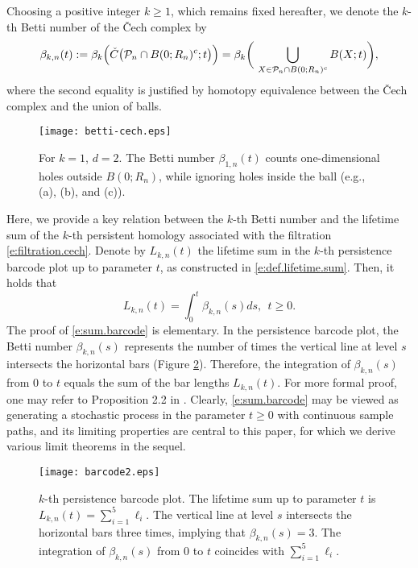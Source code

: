 \documentclass[11pt]{amsart}
\numberwithin{equation}{section}
\theoremstyle{plain}
\theoremstyle{definition}
\begin{document}
Choosing a positive integer $k \geq 1$, which remains fixed hereafter, we denote the $k$-th Betti number of the \v{C}ech complex by
$$   
\beta_{k,n}(t) := \beta_k \Bigl( \check{C}\bigl( {\mathcal P_n} \cap B(0;R_n)^c; t \bigr) \Bigr)
= \beta_k \biggl(\ \bigcup_{X \in {\mathcal P_n} \cap B(0; R_n)^c} B(X; t) \biggr),
$$
where the second equality is justified by homotopy equivalence between the \v{C}ech complex and the union of balls.
\begin{figure}[!t]
\begin{center}
\texttt{[image: betti-cech.eps]}
\caption{{\footnotesize For $k=1$, $d=2$. The Betti number $\beta_{1,n}(t)$ counts one-dimensional holes outside $B(0; R_n)$, while ignoring holes inside the ball (e.g., (a), (b), and (c)). }}
\label{f:betti-cech}
\end{center}
\end{figure}

Here, we provide a key relation between the $k$-th Betti number and the lifetime sum of the $k$-th persistent homology associated with the filtration \eqref{e:filtration.cech}. Denote by $L_{k,n}(t)$ the lifetime sum in the $k$-th persistence barcode plot up to parameter $t$, as constructed in \eqref{e:def.lifetime.sum}.
 Then, it holds that
\begin{equation}  \label{e:sum.barcode}
L_{k,n}(t) = \int_0^t \beta_{k,n}(s) ds, \ \ t\geq0.
\end{equation}
The proof of \eqref{e:sum.barcode} is elementary. In the persistence barcode plot, the Betti number $\beta_{k,n}(s)$ represents the number of times the vertical line at level $s$ intersects the horizontal bars (Figure \ref{f:barcode2}). Therefore, the integration of $\beta_{k,n}(s)$ from $0$ to $t$ equals the sum of the bar lengths $L_{k,n}(t)$. For more formal proof, one may refer to Proposition 2.2 in \cite{hiraoka:shirai:2015}. Clearly, \eqref{e:sum.barcode} may be viewed as generating a stochastic process in the parameter $t\geq0$ with continuous sample paths, and its limiting properties are central to this paper, for which we derive various limit theorems in the sequel.
\begin{figure}[!t]
\begin{center}
\texttt{[image: barcode2.eps]}
\caption{{\footnotesize $k$-th persistence barcode plot. The lifetime sum up to parameter $t$ is $L_{k,n}(t) = \sum_{i=1}^5\ell_i$. The vertical line at level $s$ intersects the horizontal bars three times, implying that $\beta_{k,n}(s) = 3$. The integration of $\beta_{k,n}(s)$ from $0$ to $t$ coincides with $\sum_{i=1}^5\ell_i$. }}
\label{f:barcode2}
\end{center}
\end{figure}
\end{document}

